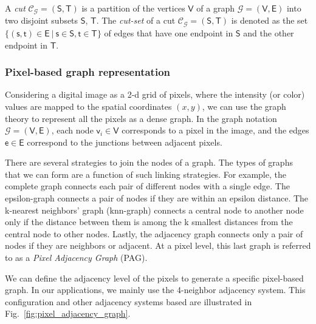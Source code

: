 \begin{definition}
	A \textit{cut} $\mathcal{C}_{\mathcal{G}}=(\mathsf{S}, \mathsf{T})$ is a partition of the vertices $\mathsf{V}$ of a graph $\mathcal{G}=(\mathsf{V}, \mathsf{E})$ into two disjoint subsets $\mathsf{S}$, $\mathsf{T}$. The \textit{cut-set} of a cut $\mathcal{C}_{\mathcal{G}}=(\mathsf{S}, \mathsf{T})$ is denoted as the set $\{ (\mathsf{s}, \mathsf{t}) \in \mathsf{E} \ | \ \mathsf{s} \in \mathsf{S}, \mathsf{t} \in \mathsf{T} \}$ of edges that have one endpoint in $\mathsf{S}$ and the other endpoint in $\mathsf{T}$.
\end{definition}
%

\subsubsection{Pixel-based graph representation}

Considering a digital image as a 2-d grid of pixels, where the intensity (or color) values are mapped to the spatial coordinates $(x, y)$, we can use the graph theory to represent all the pixels as a dense graph. In the graph notation $\mathcal{G}=(\mathsf{V}, \mathsf{E})$, each node $\mathsf{v}_i \in \mathsf{V}$ corresponds to a pixel in the image, and the edges $\mathsf{e} \in \mathsf{E}$ correspond to the junctions between adjacent pixels.

There are several strategies to join the nodes of a graph. The types of graphs that we can form are a function of such linking strategies. For example, the complete graph connects each pair of different nodes with a single edge. The epsilon-graph connects a pair of nodes if they are within an epsilon distance. The k-nearest neighbors' graph (knn-graph) connects a central node to another node only if the distance between them is among the k smallest distances from the central node to other nodes. Lastly, the adjacency graph connects only a pair of nodes if they are neighbors or adjacent. At a pixel level, this last graph is referred to as a  \textit{Pixel Adjacency Graph} (PAG).

We can define the adjacency level of the pixels to generate a specific pixel-based graph. In our applications, we mainly use the 4-neighbor adjacency system. This configuration and other adjacency systems based are illustrated in Fig.\ \ref{fig:pixel_adjacency_graph}.



